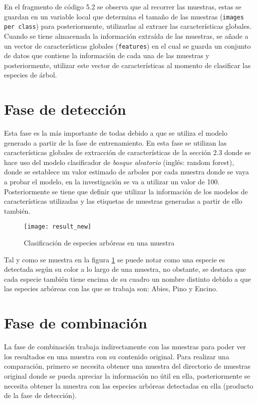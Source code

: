 En el fragmento de código 5.2 se observa que al recorrer las muestras, estas se guardan en un variable local que determina el tamaño de las muestras (\texttt{images per class}) para posteriormente, utilizarlas al extraer las características globales. Cuando se tiene almacenada la información extraída de las muestras, se añade a un vector de características globales (\texttt{features}) en el cual se guarda un conjunto de datos que contiene la información de cada una de las muestras y posteriormente, utilizar este vector de características al momento de clasificar las especies de árbol. 
\newpage

\section{Fase de detección}
Esta fase es la más importante de todas debido a que se utiliza el modelo generado a partir de la fase de entrenamiento. En esta fase se utilizan las características globales de extracción de características de la sección 2.3 donde se hace uso del modelo clasificador de {\em bosque aleatorio} (inglés: random forest)\footnotemark, donde se establece un valor estimado de arboles por cada muestra donde se vaya a probar el modelo, en la investigación se va a utilizar un valor de 100. Posteriormente se tiene que definir que utilizar la información de los modelos de características utilizadas y las etiquetas de muestras generadas a partir de ello también. 
\\

\begin{figure}[H]
  \centering
  \begin{minipage}[b]{0.8\textwidth}
        \texttt{[image: result\_new]}
    \caption{Clasificación de especies arbóreas en una muestra}
    \label{Clasificación de especies arbóreas en una muestra}
  \end{minipage}
\end{figure}

Tal y como se muestra en la figura \ref{Clasificación de especies arbóreas en una muestra}  se puede notar como una especie es detectada según su color a lo largo de una muestra, no obstante, se destaca que cada especie también tiene encima de su cuadro un nombre distinto debido a que las especies arbóreas con las que se trabaja son: Abies, Pino y Encino. 

\section{Fase de combinación}
La fase de combinación trabaja indirectamente con las muestras para poder ver los resultados en una muestra con su contenido original. Para realizar una comparación, primero se necesita obtener una muestra del directorio de muestras original donde se pueda apreciar la información no útil en ella, posteriormente se necesita obtener la muestra con las especies arbóreas detectadas en ella (producto de la fase de detección).\\ 

